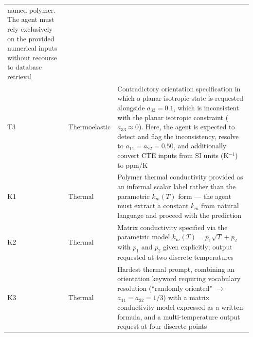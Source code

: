 \documentclass[preprint,review,10pt,number]{elsarticle}
\begin{document}
\begin{table}[h]
\begin{tabularx}{\textwidth}{llX}
                     named polymer. The agent must rely 
                     exclusively on the provided numerical 
                     inputs without recourse to database 
                     retrieval \\
T3 & Thermoelastic & Contradictory orientation specification 
                     in which a planar isotropic state is 
                     requested alongside $a_{33} = 0.1$, 
                     which is inconsistent with the planar 
                     isotropic constraint ($a_{33} \approx 
                     0$). Here, the agent is expected to detect 
                     and flag the inconsistency, resolve to 
                     $a_{11} = a_{22} = 0.50$, and 
                     additionally convert CTE inputs from 
                     SI units (K$^{-1}$) to ppm/K \\
\midrule
K1 & Thermal & Polymer thermal conductivity provided as an 
               informal scalar label rather than the 
               parametric $k_m(T)$ form --- the agent must 
               extract a constant $k_m$ from natural 
               language and proceed with the prediction \\
K2 & Thermal & Matrix conductivity specified via the 
               parametric model $k_m(T) = p_1\sqrt{T} + 
               p_2$ with $p_1$ and $p_2$ given explicitly; 
               output requested at two discrete temperatures \\
K3 & Thermal & Hardest thermal prompt, combining an 
               orientation keyword requiring vocabulary 
               resolution (``randomly oriented'' $\rightarrow$ 
               $a_{11} = a_{22} = 1/3$) with a matrix 
               conductivity model expressed as a written 
               formula, and a multi-temperature output 
               request at four discrete points \\
\bottomrule
\end{tabularx}
\end{table}


\end{document}
